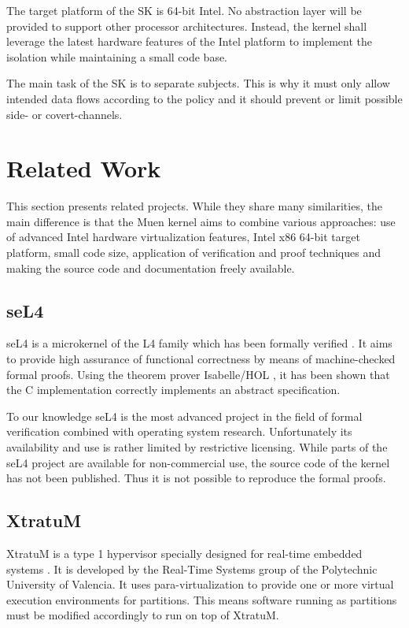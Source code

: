 The target platform of the SK is 64-bit Intel. No abstraction layer will be
provided to support other processor architectures. Instead, the kernel shall
leverage the latest hardware features of the Intel platform to implement the
isolation while maintaining a small code base.

The main task of the SK is to separate subjects. This is why it must only allow
intended data flows according to the policy and it should prevent or limit
possible side- or covert-channels.

\section{Related Work}
This section presents related projects. While they share many similarities, the
main difference is that the Muen kernel aims to combine various approaches: use
of advanced Intel hardware virtualization features, Intel x86 64-bit target
platform, small code size, application of verification and proof techniques and
making the source code and documentation freely available.

\subsection{seL4}
seL4 is a microkernel of the L4
\cite{Liedtke:1996:TRM:234215.234473} family which has been formally verified
\cite{Klein_EHACDEEKNSTW_09}. It aims to provide high assurance of functional
correctness by means of machine-checked formal proofs. Using the theorem prover
Isabelle/HOL \cite{Nipkow-Paulson-Wenzel:2002}, it has been shown that the C
implementation correctly implements an abstract specification.

To our knowledge seL4 is the most advanced project in the field of formal
verification combined with operating system research. Unfortunately its
availability and use is rather limited by restrictive licensing. While parts of
the seL4 project are available for non-commercial use, the source code of the
kernel has not been published. Thus it is not possible to reproduce the formal
proofs.

\subsection{XtratuM}
XtratuM is a type 1 hypervisor specially designed for
real-time embedded systems \cite{xtratum:2009a}. It is developed by the
Real-Time Systems group of the Polytechnic University of Valencia. It uses
para-virtualization to provide one or more virtual execution environments for
partitions. This means software running as partitions must be modified
accordingly to run on top of XtratuM.

